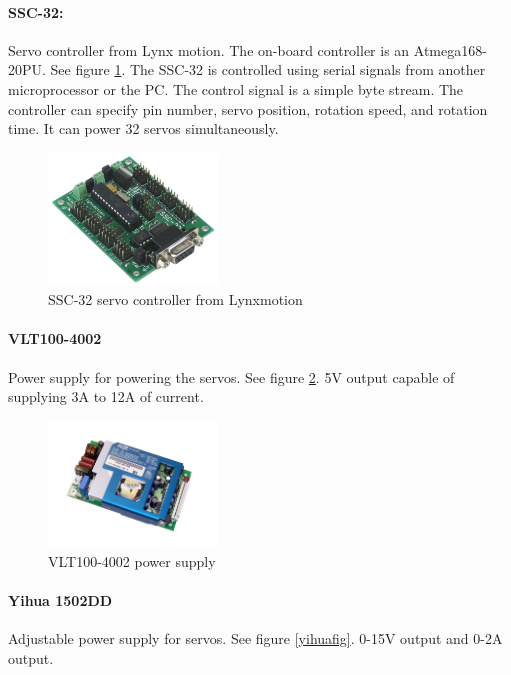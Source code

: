 \documentclass[letterpaper,12pt]{article}
\begin{document}
\paragraph{SSC-32:}Servo controller from Lynx motion. The on-board controller is
an Atmega168-20PU. See figure \ref{sscfig}. The SSC-32 is controlled using
serial signals from another microprocessor or the PC. The control signal is a
simple byte stream. The controller can specify pin number, servo position,
rotation speed, and rotation time. It can power 32 servos
simultaneously\cite{servodata}.

\begin{figure}
  \centering
    \includegraphics[width=0.4\textwidth]{figures/lynxmotion-ssc-32-servo-controller-large.jpg}
  \caption{SSC-32 servo controller from Lynxmotion}
  \label{sscfig}
\end{figure}

\paragraph{VLT100-4002}Power supply for powering the servos. See figure
\ref{vltfig}. 5V output capable of supplying 3A to 12A of current\cite{vltdata}.

\begin{figure}
  \centering
    \includegraphics[width=0.4\textwidth]{figures/VLT100-4002.jpg}
  \caption{VLT100-4002 power supply}
  \label{vltfig}
\end{figure}

\paragraph{Yihua 1502DD}Adjustable power supply for servos. See figure
\ref{yihuafig}. 0-15V output and 0-2A output\cite{yihuadata}. 
\end{document}
